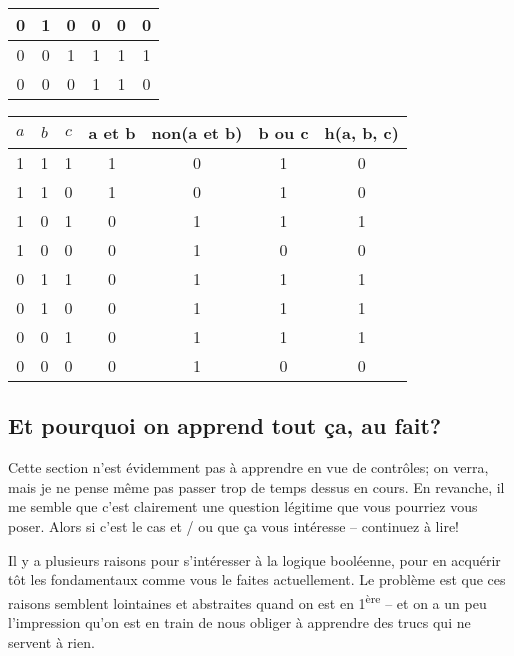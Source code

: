 \documentclass[12pt]{article}
\begin{document}
\begin{MaReponse}
\begin{alphenum}
\begin{center}
\begin{tabular}{|c|c|c|c|c|c|}
					0 & 1 & 0 & 0 & 0 & 0 \\ \hline
					0 & 0 & 1 & 1 & 1 & 1 \\ \hline
					0 & 0 & 0 & 1 & 1 & 0\\ \hline
				\end{tabular}
			\end{center}
			\item 
			\begin{center}		
				\begin{tabular}{|c|c|c|c|c|c|c|}
					\hline
					$a$ & $b$ & $c$ & a et b & non(a et b) & b ou c& h(a, b, c)\\ \hline
					1 & 1 & 1 & 1 & 0 & 1 & 0\\ \hline
					1 & 1 & 0 & 1 & 0 & 1 & 0\\ \hline
					1 & 0 & 1 & 0 & 1 & 1 & 1\\ \hline
					1 & 0 & 0 & 0 & 1 & 0 & 0\\ \hline
					0 & 1 & 1 & 0 & 1 & 1 & 1\\ \hline
					0 & 1 & 0 & 0 & 1 & 1 & 1\\ \hline
					0 & 0 & 1 & 0 & 1 & 1 & 1\\ \hline
					0 & 0 & 0 & 0 & 1 & 0& 0\\ \hline
				\end{tabular}
			\end{center}
		\end{alphenum}
	\end{MaReponse}
	
	\subsection{Et pourquoi on apprend tout ça, au fait?}
	Cette section n'est évidemment pas à apprendre en vue de contrôles; on verra, mais je ne pense même pas passer trop de temps dessus en cours. En revanche, il me semble que c'est clairement une question légitime que vous pourriez vous poser. Alors si c'est le cas et / ou que ça vous intéresse -- continuez à lire!
	
	Il y a plusieurs raisons pour s'intéresser à la logique booléenne, pour en acquérir tôt les fondamentaux comme vous le faites actuellement. Le problème est que ces raisons semblent lointaines et abstraites quand on est en 1\textsuperscript{ère} -- et on a un peu l'impression qu'on est en train de nous obliger à apprendre des trucs qui ne servent à rien.
	
\end{document}

